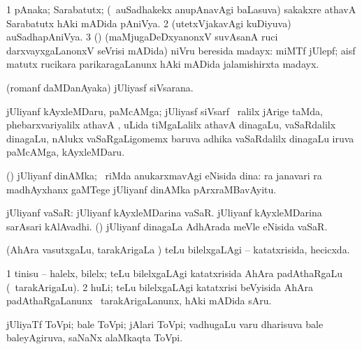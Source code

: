 \bentry
{}
\gl{\nA}
\bmng
\bnum
\num{1} pAnaka; Sarabatutx; (\kanmu\ auSadhakekx anupAnavAgi baLasuva) sakakxre athavA Sarabatutx hAki mADida pAniVya. 
\num{2} (utetxVjakavAgi kuDiyuva) auSadhapAniVya. 
\num{3} (\ame) (maMjugaDeDxyanonxV suvAsanA ruci darxvayxgaLanonxV seVrisi mADida) niVru beresida madayx:  miMTf jUlepf; aisf matutx rucikara parikaragaLanunx hAki mADida jalamishirxta madayx. 
\enum
\emng
\eentry

\bentry
{}
\gl{\gu}
\bmng
(romanf daMDanAyaka) jUliyasf siVsarana. 
\emng
\eentry

\bentry
{}
\gl{\nA}
\bmng
jUliyanf kAyxleMDaru, paMcAMga; jUliyasf siVsarf \kirxpU\ ralilx jArige taMda, phebarxvariyalilx  athavA , uLida tiMgaLalilx  athavA  dinagaLu, vaSaRdalilx  dinagaLu, nAlukx vaSaRgaLigomemx baruva adhika vaSaRdalilx  dinagaLu iruva paMcAMga, kAyxleMDaru. 
\emng
\eentry

\bentry
{}
\gl{\nA}
\bmng
(\Kavi) jUliyanf dinAMka; \kirxpU\ riMda anukarxmavAgi eNisida dina: ra janavari ra madhAyxhanx  gaMTege jUliyanf dinAMka  pArxraMBavAyitu. 
\emng
\eentry

\bentry
{}
\gl{\nA}
\bmng
jUliyanf vaSaR: 
\banum
{} jUliyanf kAyxleMDarina vaSaR. 
 jUliyanf kAyxleMDarina sarAsari kAlAvadhi. 
 (\Kavi) jUliyanf dinagaLa AdhArada meVle eNisida vaSaR. 
\eanum
\emng
\eentry

\bentry
{}
\gl{\gu}
\bmng
(AhAra vasutxgaLu, tarakArigaLa \vi) teLu bilelxgaLAgi -- katatxrisida, hecicxda. 
\emng
\eentry

\bentry
{}
\gl{\nA}
\bmng
\bnum
\num{1} tinisu -- halelx, bilelx; teLu bilelxgaLAgi katatxrisida AhAra padAthaRgaLu (\kanmu\ tarakArigaLu). 
\num{2} huLi; teLu bilelxgaLAgi katatxrisi beVyisida AhAra padAthaRgaLanunx \kanmu\ tarakArigaLanunx, hAki mADida sAru. 
\enum
\emng
\eentry

\bentry
{}
\gl{\nA}
\bmng
jUliyaTf ToVpi; bale ToVpi; jAlari ToVpi; vadhugaLu \mo varu dharisuva bale baleyAgiruva, saNaNx alaMkaqta ToVpi.   
\emng
\eentry

